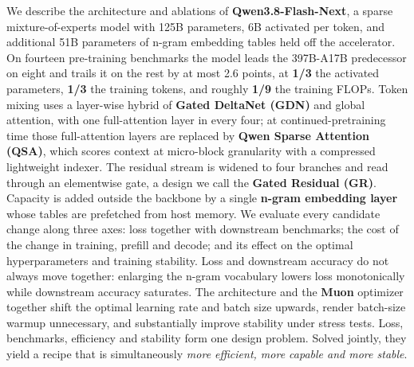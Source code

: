 
We describe the architecture and ablations of \textbf{Qwen3.8-Flash-Next}, a sparse mixture-of-experts model with 125B parameters, 6B activated per token, and additional 51B parameters of n-gram embedding tables held off the accelerator.
On fourteen pre-training benchmarks the model leads the 397B-A17B predecessor on eight and trails it on the rest by at most 2.6 points, at \textbf{1/3} the activated parameters, \textbf{1/3} the training tokens, and roughly \textbf{1/9} the training FLOPs.
Token mixing uses a layer-wise hybrid of \textbf{Gated DeltaNet (GDN)} and global attention, with one full-attention layer in every four; at continued-pretraining time those full-attention layers are replaced by \textbf{Qwen Sparse Attention (QSA)}, which scores context at micro-block granularity with a compressed lightweight indexer. The residual stream is widened to four branches and read through an elementwise gate, a design we call the \textbf{Gated Residual (GR)}. 
Capacity is added outside the backbone by a single \textbf{n-gram embedding layer} whose tables are prefetched from host memory.
We evaluate every candidate change along three axes: loss together with downstream benchmarks; the cost of the change in training, prefill and decode; and its effect on the optimal hyperparameters and training stability. 
Loss and downstream accuracy do not always move together: enlarging the n-gram vocabulary lowers loss monotonically while downstream accuracy saturates.
The architecture and the \textbf{Muon} optimizer together shift the optimal learning rate and batch size upwards, render batch-size warmup unnecessary, and substantially improve stability under stress tests.
Loss, benchmarks, efficiency and stability form one design problem. 
Solved jointly, they yield a recipe that is simultaneously \textit{more efficient, more capable and more stable}.